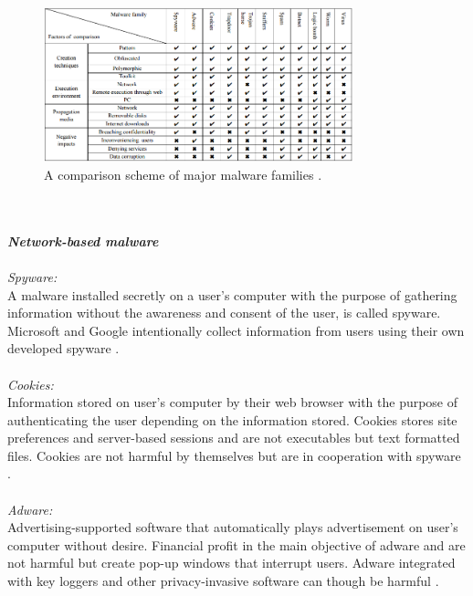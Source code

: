 \documentclass[12pt]{article} %
\begin{document}
\begin{figure}[H]
    \centering
    \includegraphics[width=0.8\textwidth]{family}
    \captionsetup{width=0.8\textwidth}
    \caption{A comparison scheme of major malware families \cite{Asurveyonmalware}.}
    \label{fig:family}
\end{figure}

\\ \\
\textbf{\emph{Network-based malware}}
\\ \\
\emph{Spyware:} \\
A malware installed secretly on a user's computer with the purpose of gathering information without the awareness and consent of the user, is called spyware. Microsoft and Google intentionally collect information from users using their own developed spyware \cite{Asurveyonmalware}.\\ \\

\emph{Cookies:} \\
Information stored on user’s computer by their web browser with the purpose of authenticating the user depending on the information stored. Cookies stores site preferences and server-based sessions and are not executables but text formatted files. Cookies are not harmful by themselves but are in cooperation with spyware \cite{Asurveyonmalware}. \\ \\

\emph{Adware:} \\
Advertising-supported software that automatically plays advertisement on user’s computer without desire. Financial profit in the main objective of adware and are not harmful but create pop-up windows that interrupt users. Adware integrated with key loggers and other privacy-invasive software can though be harmful \cite{Asurveyonmalware}. \\ \\
\end{document}
